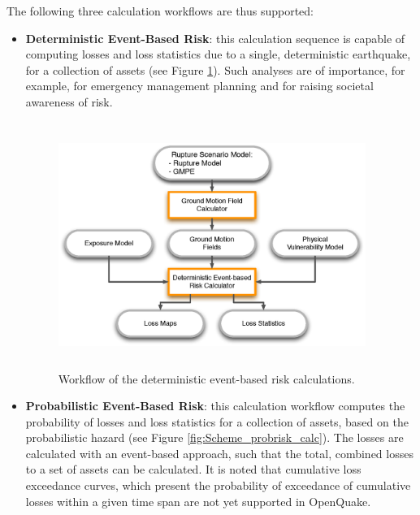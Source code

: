 The following three calculation workflows are thus supported:
\begin{itemize}
\item \textbf{Deterministic Event-Based Risk}: this calculation sequence is capable of computing losses and loss statistics due to a single,
deterministic earthquake, for a collection of assets (see Figure \ref{fig:Scheme_detrisk_calc}). Such analyses are of importance, for example, for emergency management planning and for raising societal awareness of risk. 

\begin{figure}[ht]
\centering
\includegraphics[width=10cm,height=8cm]{./Figures/Part_Risk/Scheme_Deter_calc.eps}
\caption{Workflow of the deterministic event-based risk calculations.}
\label{fig:Scheme_detrisk_calc}
\end{figure}

\item \textbf{Probabilistic Event-Based Risk}: this calculation workflow computes the probability of losses and loss statistics for a collection of
assets, based on the probabilistic hazard (see Figure \ref{fig:Scheme_probrisk_calc}). The losses are calculated with an event-based approach, such that the total, combined losses to a set of assets can be calculated. It is noted that cumulative loss exceedance curves, which present the probability of exceedance of cumulative losses within a given time span are not yet supported in OpenQuake.


\end{itemize}

